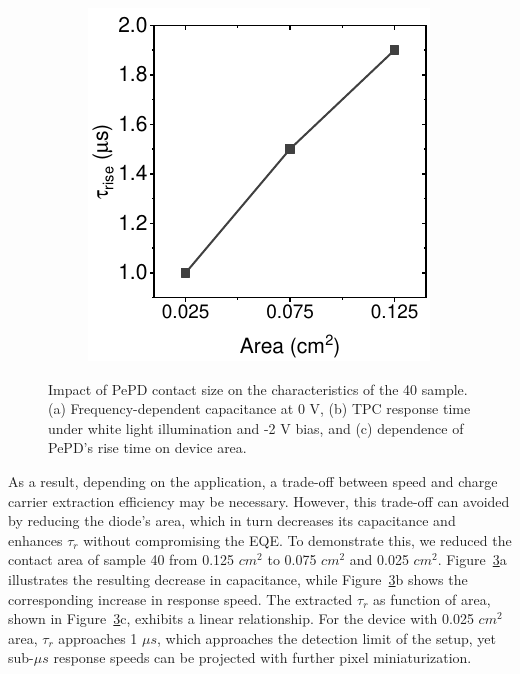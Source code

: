 \begin{figure}[htbp]
\begin{subfigure}{0.3\textwidth}
        \caption{}
        \label{}
    \end{subfigure}
    \hfill
    \begin{subfigure}{0.29\textwidth}
        \centering
        \includegraphics[width=\textwidth]{chapters/transport_layers/images/Rise_time_farea.pdf}
        \caption{}
        \label{}
    \end{subfigure}
    
    \caption{Impact of PePD contact size on the characteristics of the 40 sample. (a) Frequency-dependent capacitance at 0 V, (b) TPC response time under white light illumination and -2 V bias, and (c) dependence of PePD's rise time on device area.}
    \label{fig:etl_opt:dev_area}
\end{figure}

As a result, depending on the application, a trade-off between speed and charge carrier extraction efficiency may be necessary. However, this trade-off can avoided by reducing the diode's area, which in turn decreases its capacitance and enhances $\tau_r$ without compromising the EQE. To demonstrate this, we reduced the contact area of sample 40 from 0.125 $cm^2$ to 0.075 $cm^2$ and 0.025 $cm^2$. Figure~\ref{fig:etl_opt:dev_area}a illustrates the resulting decrease in capacitance, while Figure~\ref{fig:etl_opt:dev_area}b shows the corresponding increase in response speed. The extracted $\tau_r$ as function of area, shown in Figure~\ref{fig:etl_opt:dev_area}c, exhibits a linear relationship. For the device with 0.025 $cm^2$ area, $\tau_r$ approaches 1 $\mu s$, which approaches the detection limit of the setup, yet sub-$\mu s$ response speeds can be projected with further pixel miniaturization. 

